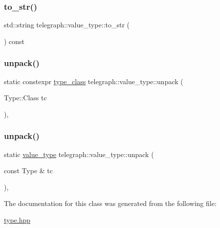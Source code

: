 \mbox{\label{classtelegraph_1_1value__type_a59f254ed2dcb92ecb9ba85b4d3ef8e68}} 
\subsubsection{\texorpdfstring{to\+\_\+str()}{to\_str()}}
{\footnotesize\ttfamily std\+::string telegraph\+::value\+\_\+type\+::to\+\_\+str (\begin{DoxyParamCaption}{ }\end{DoxyParamCaption}) const\hspace{0.3cm}{\ttfamily [inline]}}

\mbox{\label{classtelegraph_1_1value__type_abf022119eeb1ba37cfe259550830a04d}} 
\subsubsection{\texorpdfstring{unpack()}{unpack()}\hspace{0.1cm}{\footnotesize\ttfamily [1/2]}}
{\footnotesize\ttfamily static constexpr \hyperlink{classtelegraph_1_1value__type_a516081c0a4e231cb22554f48f052ff6f}{type\+\_\+class} telegraph\+::value\+\_\+type\+::unpack (\begin{DoxyParamCaption}\item[{Type\+::\+Class}]{tc }\end{DoxyParamCaption})\hspace{0.3cm}{\ttfamily [inline]}, {\ttfamily [static]}}

\mbox{\label{classtelegraph_1_1value__type_a3a4a3de4847ee82da57b5926b534df1f}} 
\subsubsection{\texorpdfstring{unpack()}{unpack()}\hspace{0.1cm}{\footnotesize\ttfamily [2/2]}}
{\footnotesize\ttfamily static \hyperlink{classtelegraph_1_1value__type}{value\+\_\+type} telegraph\+::value\+\_\+type\+::unpack (\begin{DoxyParamCaption}\item[{const Type \&}]{tc }\end{DoxyParamCaption})\hspace{0.3cm}{\ttfamily [inline]}, {\ttfamily [static]}}



The documentation for this class was generated from the following file\+:\begin{DoxyCompactItemize}
\item 
\hyperlink{type_8hpp}{type.\+hpp}\end{DoxyCompactItemize}

